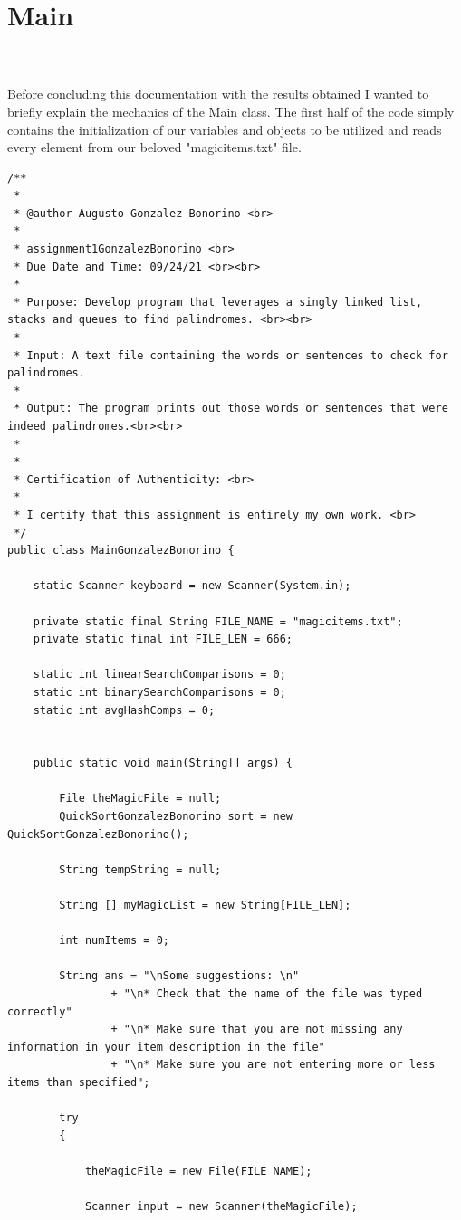 \documentclass[letterpaper, 10pt]{article}
\begin{document}
\section{Main}
\\
\\
Before concluding this documentation with the results obtained I wanted to briefly explain the mechanics of the Main class. The first half of the code simply contains the initialization of our variables and objects to be utilized and reads every element from our beloved "magicitems.txt" file. 
\begin{lstlisting}
/**
 * 
 * @author Augusto Gonzalez Bonorino <br>
 * 
 * assignment1GonzalezBonorino <br>
 * Due Date and Time: 09/24/21 <br><br>
 *
 * Purpose: Develop program that leverages a singly linked list, stacks and queues to find palindromes. <br><br>
 *			
 * Input: A text file containing the words or sentences to check for palindromes.
 * 		  
 * Output: The program prints out those words or sentences that were indeed palindromes.<br><br>
 *		   
 *
 * Certification of Authenticity: <br>
 * 
 * I certify that this assignment is entirely my own work. <br>
 */
public class MainGonzalezBonorino {
	
	static Scanner keyboard = new Scanner(System.in);
	
	private static final String FILE_NAME = "magicitems.txt";
	private static final int FILE_LEN = 666;
	
	static int linearSearchComparisons = 0;
	static int binarySearchComparisons = 0;
    static int avgHashComps = 0;

	
	public static void main(String[] args) {
		
		File theMagicFile = null;
		QuickSortGonzalezBonorino sort = new QuickSortGonzalezBonorino();
		
		String tempString = null;

		String [] myMagicList = new String[FILE_LEN];
		
		int numItems = 0;
		
		String ans = "\nSome suggestions: \n"
				+ "\n* Check that the name of the file was typed correctly"
				+ "\n* Make sure that you are not missing any information in your item description in the file"
				+ "\n* Make sure you are not entering more or less items than specified";
		
		try
		{
			
			theMagicFile = new File(FILE_NAME);
			
			Scanner input = new Scanner(theMagicFile);
			

\end{lstlisting}
\end{document}
